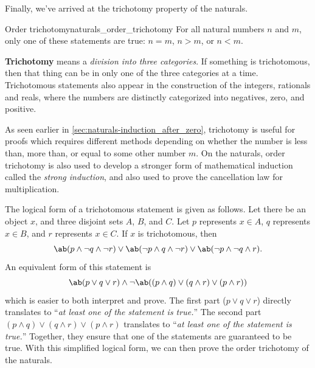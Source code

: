Finally, we've arrived at the trichotomy property of the naturals.
\begin{lemma}{Order trichotomy}{naturals_order_trichotomy}
  For all natural numbers \(n\) and \(m\), only one of these statements are true: \(n = m\),
  \(n > m\), or \(n < m\).
\end{lemma}
\textbf{Trichotomy} means a \emph{division into three categories}. If something is trichotomous,
then that thing can be in only one of the three categories at a time. Trichotomous statements also
appear in the construction of the integers, rationals and reals, where the numbers are distinctly
categorized into negatives, zero, and positive.

As seen earlier in \cref{sec:naturals-induction_after_zero}, trichotomy is useful for proofs which
requires different methods depending on whether the number is less than, more than, or equal to some
other number \(m\). On the naturals, order trichotomy is also used to develop a stronger form of
mathematical induction called the \emph{strong induction}, and also used to prove the cancellation
law for multiplication.

The logical form of a trichotomous statement is given as follows. Let there be an object \(x\), and
three disjoint sets \(A\), \(B\), and \(C\). Let \(p\) represents \(x \in A\), \(q\) represents
\(x \in B\), and \(r\) represents \(x \in C\). If \(x\) is trichotomous, then
\begin{equation}
  \ab(p \land \lnot q \land \lnot r)
  \lor \ab(\lnot p \land q \land \lnot r)
  \lor \ab(\lnot p \land \lnot q \land r).
\end{equation}
An equivalent form of this statement is
\begin{equation}
  \ab(p \lor q \lor r) \land \lnot \ab((p \land q) \lor (q \land r) \lor (p \land r))
\end{equation}
which is easier to both interpret and prove. The first part (\(p \lor q \lor r\)) directly
translates to \enquote{\emph{at least one of the statement is true.}} The second part
\((p \land q) \lor (q \land r) \lor (p \land r)\) translates to
\enquote{\emph{at least one of the statement is true.}} Together, they ensure that one of the
statements are guaranteed to be true. With this simplified logical form, we can then prove the order
trichotomy of the naturals.

